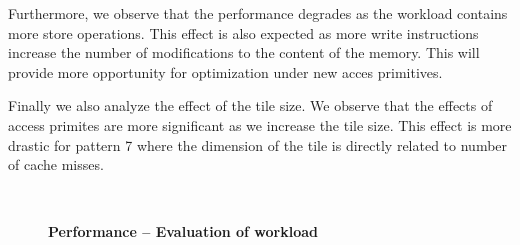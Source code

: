 \documentclass[letterpaper]{article}
\begin{document}
Furthermore, we observe that the performance degrades as the workload contains more store operations. 
This effect is also expected as more write instructions 
increase the number of modifications to the content of the 
memory. This will provide more opportunity for optimization under new acces primitives. 

Finally we also analyze the effect of the tile size. We observe that the effects of access primites are more
significant as we increase the tile size. This effect is more drastic for pattern 7 where the dimension of the
tile is directly related to number of cache misses. 

\begin{figure}[ht!]
    \centering
    \\
    \caption{\textbf{Performance -- Evaluation of workload}}


\end{figure}
\end{document}

